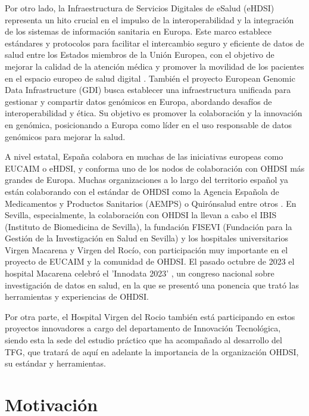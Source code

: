Por otro lado, la Infraestructura de Servicios Digitales de eSalud (eHDSI) \cite{DHE2023eHDSI} representa un hito crucial en el impulso de la interoperabilidad y la integración de los sistemas de información sanitaria en Europa. Este marco establece estándares y protocolos para facilitar el intercambio seguro y eficiente de datos de salud entre los Estados miembros de la Unión Europea, con el objetivo de mejorar la calidad de la atención médica y promover la movilidad de los pacientes en el espacio europeo de salud digital \cite{EU2023Servicios}. También el proyecto European Genomic Data Infrastructure (GDI) \cite{GDI2022GDI} busca establecer una infraestructura unificada para gestionar y compartir datos genómicos en Europa, abordando desafíos de interoperabilidad y ética. Su objetivo es promover la colaboración y la innovación en genómica, posicionando a Europa como líder en el uso responsable de datos genómicos para mejorar la salud.

A nivel estatal, España colabora en muchas de las iniciativas europeas como EUCAIM o eHDSI, y conforma uno de los nodos de colaboración con OHDSI más grandes de Europa. Muchas organizaciones a lo largo del territorio español ya están colaborando con el estándar de OHDSI como la Agencia Española de Medicamentos y Productos Sanitarios (AEMPS) o Quirónsalud entre otros \cite{ohdsiSpain}. En Sevilla, especialmente, la colaboración con OHDSI la llevan a cabo el IBIS (Instituto de Biomedicina de Sevilla), la fundación FISEVI (Fundación para la Gestión de la Investigación en Salud en Sevilla) y los hospitales universitarios Virgen Macarena y Virgen del Rocío, con participación muy importante en el proyecto de EUCAIM y la comunidad de OHDSI. El pasado octubre de 2023 el hospital Macarena celebró el 'Innodata 2023' \cite{HUVM2023INNODATA}, un congreso nacional sobre investigación de datos en salud, en la que se presentó una ponencia que trató las herramientas y experiencias de OHDSI. 

Por otra parte, el Hospital Virgen del Rocio también está participando en estos proyectos innovadores a cargo del departamento de Innovación Tecnológica, siendo esta la sede del estudio práctico que ha acompañado al desarrollo del TFG, que tratará de aquí en adelante la importancia de la organización OHDSI, su estándar y herramientas.


\section{Motivación} \label{sec:01Motivacion}

